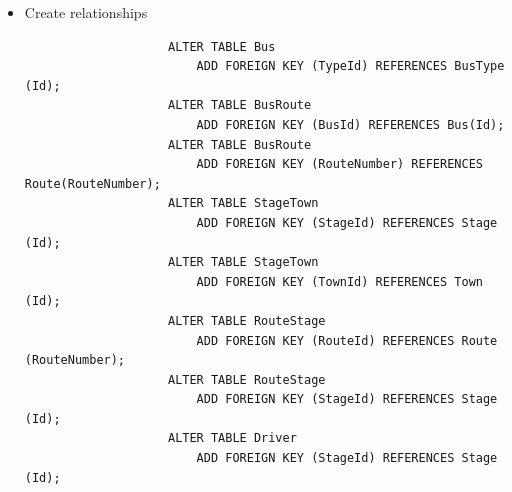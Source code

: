 \documentclass[12pt,titlepage]{article}
\begin{document}
\begin{enumerate}[label=\alph*.)]
{\begin{itemize}
{\begin{verbatim}
                    CREATE TABLE Driver
                    (
                        Id              INT          NOT NULL PRIMARY KEY AUTO_INCREMENT,
                        Name            VARCHAR(255) NOT NULL,
                        Address         VARCHAR(255) NOT NULL,
                        EmployeeNumber  CHAR(15)     NOT NULL,
                        TelephoneNumber VARCHAR(13)  NOT NULL,
                        StageId         INT          NOT NULL
                    );
                \end{verbatim}
            }
            \item {
                Create relationships

                \begin{verbatim}
                    ALTER TABLE Bus
                        ADD FOREIGN KEY (TypeId) REFERENCES BusType (Id);
                    ALTER TABLE BusRoute
                        ADD FOREIGN KEY (BusId) REFERENCES Bus(Id);
                    ALTER TABLE BusRoute
                        ADD FOREIGN KEY (RouteNumber) REFERENCES Route(RouteNumber);
                    ALTER TABLE StageTown
                        ADD FOREIGN KEY (StageId) REFERENCES Stage (Id);
                    ALTER TABLE StageTown
                        ADD FOREIGN KEY (TownId) REFERENCES Town (Id);
                    ALTER TABLE RouteStage
                        ADD FOREIGN KEY (RouteId) REFERENCES Route (RouteNumber);
                    ALTER TABLE RouteStage
                        ADD FOREIGN KEY (StageId) REFERENCES Stage (Id);
                    ALTER TABLE Driver
                        ADD FOREIGN KEY (StageId) REFERENCES Stage (Id);
                \end{verbatim}
            }
        \end{itemize}
    }
\end{enumerate}
\end{document}
